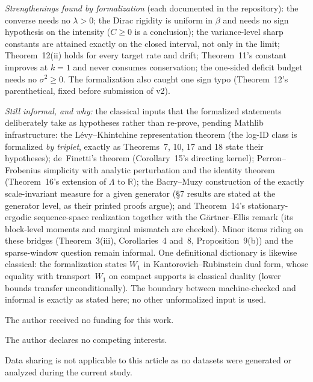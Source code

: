 \documentclass[pdflatex,sn-mathphys-num]{sn-jnl}
\theoremstyle{thmstyleone}
\theoremstyle{thmstyletwo}
\theoremstyle{thmstylethree}
\begin{document}
\emph{Strengthenings found by formalization} (each documented in the
repository): the converse needs no $\lambda > 0$; the Dirac rigidity is
uniform in $\beta$ and needs no sign hypothesis on the intensity
($C \ge 0$ is a conclusion); the variance-level sharp constants are
attained exactly on
the closed interval, not only in the limit; Theorem~12(ii) holds for
every target rate and drift; Theorem~11's constant improves at $k = 1$
and never consumes conservation; the one-sided deficit budget needs no
$\sigma^2 \ge 0$.  The formalization also caught one sign typo
(Theorem~12's parenthetical, fixed before submission of v2).

\emph{Still informal, and why:} the classical inputs that the
formalized statements deliberately take as hypotheses rather than
re-prove, pending Mathlib infrastructure: the L\'evy--Khintchine
representation theorem (the log-ID class is formalized \emph{by
triplet}, exactly as Theorems~7, 10, 17 and 18 state their
hypotheses); de~Finetti's theorem (Corollary~15's directing kernel);
Perron--Frobenius simplicity with analytic perturbation and the
identity theorem (Theorem~16's extension of $\Lambda$ to $\mathbb R$);
the Bacry--Muzy construction of the exactly scale-invariant measure
for a given generator (\S7 results are stated at the generator level,
as their printed proofs argue); and Theorem~14's stationary-ergodic
sequence-space realization together with the G\"artner--Ellis remark
(its block-level moments and marginal mismatch are checked).  Minor
items riding on these bridges (Theorem~3(iii), Corollaries~4 and~8,
Proposition~9(b)) and the sparse-window question remain informal.
One definitional dictionary is likewise classical: the formalization
states $W_1$ in Kantorovich--Rubinstein dual form, whose equality
with transport~$W_1$ on compact supports is classical duality
(lower bounds transfer unconditionally).  The
boundary between machine-checked and informal is exactly as stated
here; no other unformalized input is used.

\backmatter

The author received no funding for this work.

The author declares no competing interests.

Data sharing is not applicable to this article as no datasets were
generated or analyzed during the current study.
\end{document}
